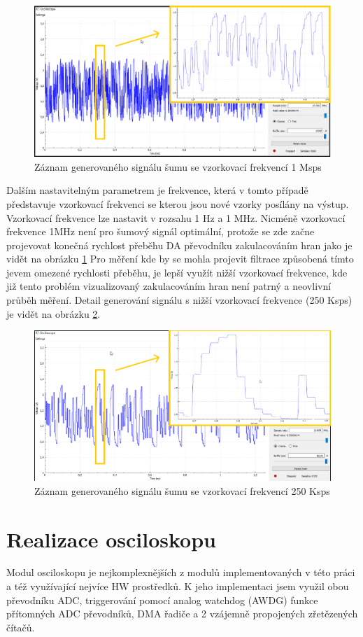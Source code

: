\begin{figure}[H]
	\centering
	\includegraphics[width=0.8\linewidth]{Figs/Diagrams/SVG/NoiseZoom1M.pdf}
	\caption{Záznam generovaného signálu šumu se vzorkovací frekvencí 1 Msps}
	\label{fig:noiseZoom1M}
\end{figure}
Dalším nastavitelným parametrem je frekvence, která v tomto případě představuje vzorkovací frekvenci se kterou jsou nové vzorky posílány na výstup. Vzorkovací frekvence lze nastavit v rozsahu 1 Hz a 1 MHz. Nicméně vzorkovací frekvence 1MHz není pro šumový signál optimální, protože se zde začne projevovat konečná rychlost přeběhu DA převodníku zakulacováním hran jako je vidět na obrázku \ref{fig:noiseZoom1M} Pro měření  kde by se mohla projevit filtrace způsobená tímto jevem omezené rychlosti přeběhu, je lepší využít nižší vzorkovací frekvence, kde již tento problém vizualizovaný zakulacováním hran není patrný a neovlivní průběh měření. Detail generování signálu s nižší vzorkovací frekvence (250 Ksps) je vidět na obrázku \ref{fig:noiseZoom250}.
\begin{figure}[H]
	\centering
	\includegraphics[width=0.8\linewidth]{Figs/Diagrams/SVG/NoiseZoom250K.pdf}
	\caption{Záznam generovaného signálu šumu se vzorkovací frekvencí 250 Ksps}
	\label{fig:noiseZoom250}
\end{figure}


\section{Realizace osciloskopu}
Modul osciloskopu je nejkomplexnějších z modulů implementovaných v této práci a též využívající nejvíce HW prostředků. K jeho implementaci jsem využil obou převodníku ADC, triggerování pomocí analog watchdog (AWDG) funkce přítomných ADC převodníků, DMA řadiče a 2 vzájemně propojených zřetězených čítačů.
